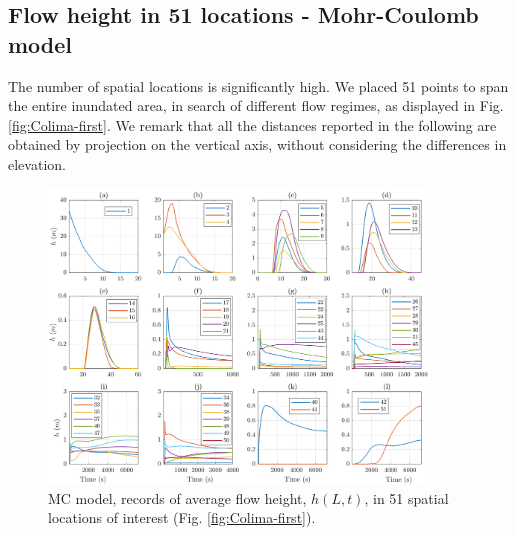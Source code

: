 \documentclass{article}
\begin{document}
\subsection{Flow height in 51 locations - Mohr-Coulomb model}
The number of spatial locations is significantly high. We placed 51 points to span the entire inundated area, in search of different flow regimes, as displayed in Fig. \ref{fig:Colima-first}. We remark that all the distances reported in the following are obtained by projection on the vertical axis, without considering the differences in elevation.
\begin{figure}[H]
         \centering
        \includegraphics[width=0.9\textwidth]{MC&VS_51/Height_MC2.png}
        \caption{MC model, records of average flow height, $h(L,t)$, in 51 spatial locations of interest (Fig. \ref{fig:Colima-first}).}
        \label{fig:BAF-H-MC}
\end{figure}
\end{document}
